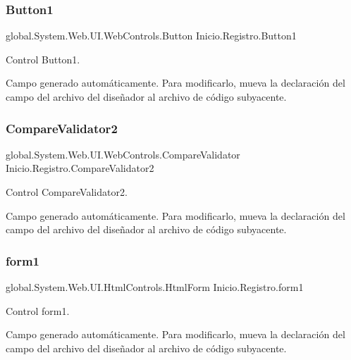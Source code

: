\subsubsection{\texorpdfstring{Button1}{Button1}}
{\footnotesize\ttfamily global.\+System.\+Web.\+U\+I.\+Web\+Controls.\+Button Inicio.\+Registro.\+Button1\hspace{0.3cm}{\ttfamily [protected]}}



Control Button1. 

Campo generado automáticamente. Para modificarlo, mueva la declaración del campo del archivo del diseñador al archivo de código subyacente. \mbox{\label{classInicio_1_1Registro_abb680432cdd29ebb5f813036c644dadc}} 
\subsubsection{\texorpdfstring{CompareValidator2}{CompareValidator2}}
{\footnotesize\ttfamily global.\+System.\+Web.\+U\+I.\+Web\+Controls.\+Compare\+Validator Inicio.\+Registro.\+Compare\+Validator2\hspace{0.3cm}{\ttfamily [protected]}}



Control Compare\+Validator2. 

Campo generado automáticamente. Para modificarlo, mueva la declaración del campo del archivo del diseñador al archivo de código subyacente. \mbox{\label{classInicio_1_1Registro_a0b8d260039acc63632a758544652ea24}} 
\subsubsection{\texorpdfstring{form1}{form1}}
{\footnotesize\ttfamily global.\+System.\+Web.\+U\+I.\+Html\+Controls.\+Html\+Form Inicio.\+Registro.\+form1\hspace{0.3cm}{\ttfamily [protected]}}



Control form1. 

Campo generado automáticamente. Para modificarlo, mueva la declaración del campo del archivo del diseñador al archivo de código subyacente. \mbox{\label{classInicio_1_1Registro_aa4f71bea88748ad5dfc036a400cb4537}} 
